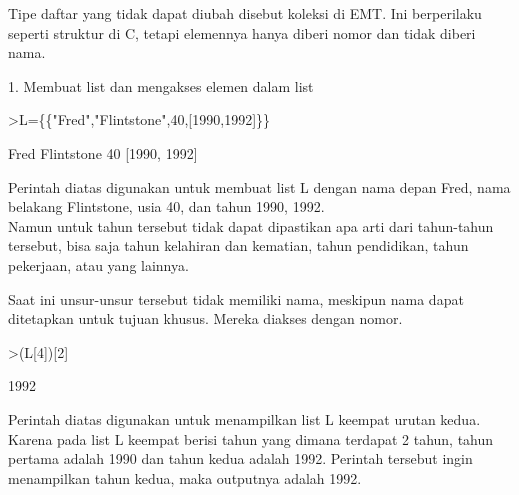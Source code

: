 \documentclass{article}
\begin{document}
\begin{eulernotebook}
\begin{eulercomment}
\begin{eulercomment}
\begin{eulercomment}
\begin{eulercomment}
\begin{eulercomment}
\begin{eulercomment}
\begin{eulercomment}
\begin{eulercomment}
\begin{eulercomment}
\begin{eulercomment}
\begin{eulercomment}
\begin{eulercomment}
\begin{eulercomment}
Tipe daftar yang tidak dapat diubah disebut koleksi di EMT. Ini
berperilaku seperti struktur di C, tetapi elemennya hanya diberi nomor
dan tidak diberi nama.

1. Membuat list dan mengakses elemen dalam list
\end{eulercomment}
\begin{eulerprompt}
>L=\{\{"Fred","Flintstone",40,[1990,1992]\}\}
\end{eulerprompt}
\begin{euleroutput}
  Fred
  Flintstone
  40
  [1990,  1992]
\end{euleroutput}
\begin{eulercomment}
Perintah diatas digunakan untuk membuat list L dengan nama depan Fred,
nama belakang Flintstone, usia 40, dan tahun 1990, 1992.\\
Namun untuk tahun tersebut tidak dapat dipastikan apa arti dari
tahun-tahun tersebut, bisa saja tahun kelahiran dan kematian, tahun
pendidikan, tahun pekerjaan, atau yang lainnya.

Saat ini unsur-unsur tersebut tidak memiliki nama, meskipun nama dapat
ditetapkan untuk tujuan khusus. Mereka diakses dengan nomor.
\end{eulercomment}
\begin{eulerprompt}
>(L[4])[2]
\end{eulerprompt}
\begin{euleroutput}
  1992
\end{euleroutput}
\begin{eulercomment}
Perintah diatas digunakan untuk menampilkan list L keempat urutan
kedua. Karena pada list L keempat berisi tahun yang dimana terdapat 2
tahun, tahun pertama adalah 1990 dan tahun kedua adalah 1992. Perintah
tersebut ingin menampilkan tahun kedua, maka outputnya adalah 1992.


\end{eulercomment}
\end{eulercomment}
\end{eulercomment}
\end{eulercomment}
\end{eulercomment}
\end{eulercomment}
\end{eulercomment}
\end{eulercomment}
\end{eulercomment}
\end{eulercomment}
\end{eulercomment}
\end{eulercomment}
\end{eulercomment}
\end{eulernotebook}
\end{document}
